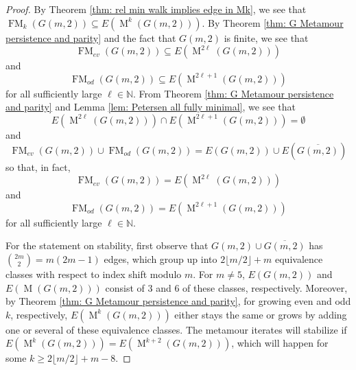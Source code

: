 \documentclass[12pt]{amsart}
\theoremstyle{definition}
\newtheorem{definition}[theorem]{Definition}
\theoremstyle{remark}
\numberwithin{equation}{section}
\numberwithin{figure}{section}
\newcommand{\M}{\operatorname{M}}
\newcommand{\FM}{\operatorname{FM}}
\newcommand{\N}{\mathbb{N}}
\begin{document}
\begin{proof}
    By Theorem \ref{thm: rel min walk implies edge in Mk}, we see that $\FM_k(G(m,2)) \subseteq E(\M^k(G(m,2)))$. By Theorem \ref{thm: G Metamour persistence and parity} and the fact that $G(m,2)$ is finite, we see that   
    \[ \FM_{ev}(G(m,2)) \subseteq E(\M^{2\ell}(G(m,2)))\] and
       \[\FM_{od}(G(m,2)) \subseteq E(\M^{2\ell+1}(G(m,2))) \]
    for all sufficiently large $\ell\in\N$.    
    From Theorem \ref{thm: G Metamour persistence and parity} and Lemma \ref{lem: Petersen all fully minimal}, we see that
    \[ E(\M^{2\ell}(G(m,2))) \cap E(\M^{2\ell+1}(G(m,2))) = \emptyset\] 
    and
    \[ \FM_{ev}(G(m,2)) \cup \FM_{od}(G(m,2)) = E(G(m,2)) \cup E(\overline{G(m,2)})\]
    so that, in fact, 
    \[ \FM_{ev}(G(m,2)) = E(\M^{2\ell}(G(m,2)))\] and
       \[\FM_{od}(G(m,2)) = E(\M^{2\ell+1}(G(m,2))) \]
    for all sufficiently large $\ell\in\N$.
    
    For the statement on stability, first observe that $G(m,2) \cup \overline{G(m,2)}$ has $\binom{2m}{2} = {m(2m-1)}$ edges, which group up into $2 \lfloor m/2 \rfloor +m$ equivalence classes with respect to index shift modulo $m$. For $m\ne 5$, $E(G(m,2))$ and $E(\M(G(m,2)))$ consist of $3$ and $6$ of these classes, respectively. Moreover, by Theorem \ref{thm: G Metamour persistence and parity}, for growing even and odd $k$, respectively, $E(\M^k(G(m,2)))$ either stays the same or grows by adding one or several of these equivalence classes. The metamour iterates will stabilize if $E(\M^k(G(m,2)))=E(\M^{k+2}(G(m,2)))$, which will happen for some $k\ge 2 \lfloor m/2 \rfloor +m-8$.
\end{proof}


\end{document}
